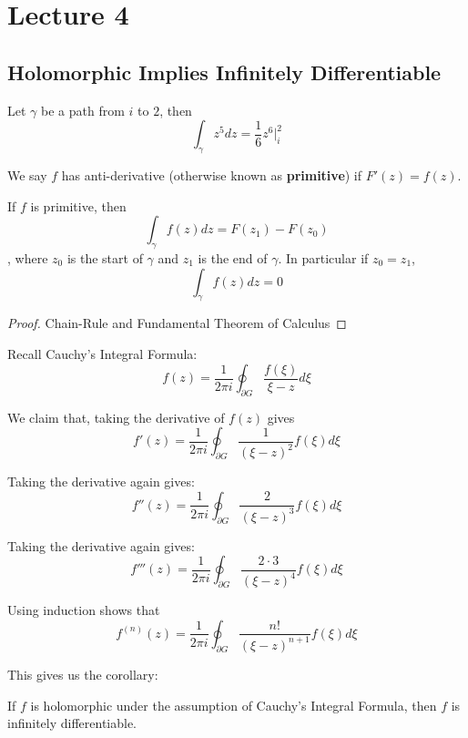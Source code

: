 \section{Lecture 4}

\subsection{Holomorphic Implies Infinitely Differentiable}

\begin{example}
Let $\gamma$ be a path from $i$ to $2$, then
\[\int_\gamma z^5 dz = \frac{1}{6} z^6 |_i^2\]
\end{example}

\begin{definition}
We say $f$ has anti-derivative (otherwise known as \textbf{primitive}) if $F'(z) = f(z)$.
\end{definition}

\begin{proposition}
    If $f$ is primitive, then
    \[\int_\gamma f(z) dz = F(z_1) - F(z_0)\]
    , where $z_0$ is the start of $\gamma$ and $z_1$ is the end of $\gamma$. In particular if $z_0 = z_1$,
    \[\int_\gamma f(z) dz = 0\]
\end{proposition}

\begin{proof}
Chain-Rule and Fundamental Theorem of Calculus
\end{proof}

Recall Cauchy's Integral Formula:
\[f(z) = \frac{1}{2\pi i} \oint_{\partial G} \frac{f(\xi)}{\xi - z} d\xi\]

We claim that, taking the derivative of $f(z)$ gives
\[f'(z) = \frac{1}{2\pi i}  \oint_{\partial G} \frac{1}{(\xi - z)^2} f(\xi) d\xi\]

Taking the derivative again gives:
\[f''(z) = \frac{1}{2\pi i}  \oint_{\partial G} \frac{2}{(\xi - z)^3} f(\xi) d\xi\]

Taking the derivative again gives:
\[f'''(z) = \frac{1}{2\pi i}  \oint_{\partial G} \frac{2 \cdot 3}{(\xi - z)^4} f(\xi) d\xi\]

Using induction shows that
\[f^{(n)}(z) = \frac{1}{2 \pi i} \oint_{\partial G} \frac{n!}{(\xi - z)^{n+1}} f(\xi) d\xi\]

This gives us the corollary:

\begin{corollary}
    If $f$ is holomorphic under the assumption of Cauchy's Integral Formula, then $f$ is infinitely differentiable.
\end{corollary}

